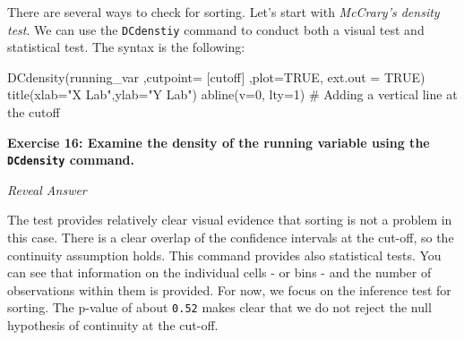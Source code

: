 \documentclass[
  letterpaper,
  DIV=11,
  numbers=noendperiod]{scrreprt}
\newenvironment{Shaded}{\begin{snugshade}}{\end{snugshade}}
\newcommand{\AttributeTok}[1]{\textcolor[rgb]{0.40,0.45,0.13}{#1}}
\newcommand{\CommentTok}[1]{\textcolor[rgb]{0.37,0.37,0.37}{#1}}
\newcommand{\ConstantTok}[1]{\textcolor[rgb]{0.56,0.35,0.01}{#1}}
\newcommand{\DecValTok}[1]{\textcolor[rgb]{0.68,0.00,0.00}{#1}}
\newcommand{\FunctionTok}[1]{\textcolor[rgb]{0.28,0.35,0.67}{#1}}
\newcommand{\NormalTok}[1]{\textcolor[rgb]{0.00,0.23,0.31}{#1}}
\newcommand{\SpecialCharTok}[1]{\textcolor[rgb]{0.37,0.37,0.37}{#1}}
\newcommand{\StringTok}[1]{\textcolor[rgb]{0.13,0.47,0.30}{#1}}
\begin{document}
There are several ways to check for sorting. Let's start with
\emph{McCrary's density test}. We can use the \texttt{DCdenstiy} command
to conduct both a visual test and statistical test. The syntax is the
following:

\begin{Shaded}
\begin{Highlighting}[]
\FunctionTok{DCdensity}\NormalTok{(running\_var ,}\AttributeTok{cutpoint=}\NormalTok{ [cutoff] ,}\AttributeTok{plot=}\ConstantTok{TRUE}\NormalTok{, }\AttributeTok{ext.out =} \ConstantTok{TRUE}\NormalTok{)}
\FunctionTok{title}\NormalTok{(}\AttributeTok{xlab=}\StringTok{"X Lab"}\NormalTok{,}\AttributeTok{ylab=}\StringTok{"Y Lab"}\NormalTok{)}
\FunctionTok{abline}\NormalTok{(}\AttributeTok{v=}\DecValTok{0}\NormalTok{, }\AttributeTok{lty=}\DecValTok{1}\NormalTok{) }\CommentTok{\# Adding a vertical line at the cutoff}
\end{Highlighting}
\end{Shaded}

\textbf{Exercise 16: Examine the density of the running variable using
the \texttt{DCdensity} command.}

\emph{Reveal Answer}

\begin{Shaded}
\end{Shaded}

The test provides relatively clear visual evidence that sorting is not a
problem in this case. There is a clear overlap of the confidence
intervals at the cut-off, so the continuity assumption holds. This
command provides also statistical tests. You can see that information on
the individual cells - or bins - and the number of observations within
them is provided. For now, we focus on the inference test for sorting.
The p-value of about \texttt{0.52} makes clear that we do not reject the
null hypothesis of continuity at the cut-off.
\end{document}
